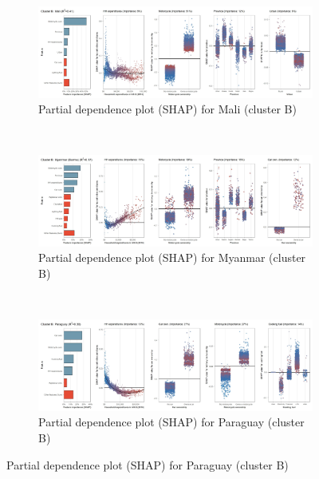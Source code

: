 \begin{figure}[ht!]\ContinuedFloat
    \centering
   \begin{subfigure}[b]{\textwidth}
         \centering
         \caption{Partial dependence plot (SHAP) for Mali (cluster B)}
         \label{fig:5b_MLI}
         \includegraphics[width=\textwidth]{Figure 5b/Figure_5b_MLI}         
     \end{subfigure}
    \\
    \vspace{0.5cm}
   \begin{subfigure}[b]{\textwidth}
         \centering
         \caption{Partial dependence plot (SHAP) for Myanmar (cluster B)}
         \label{fig:5b_MMR}
         \includegraphics[width=\textwidth]{Figure 5b/Figure_5b_MMR}         
     \end{subfigure}
    \\
    \vspace{0.5cm}
   \begin{subfigure}[b]{\textwidth}
         \centering
         \caption{Partial dependence plot (SHAP) for Paraguay (cluster B)}
         \label{fig:5b_PRY}
         \includegraphics[width=\textwidth]{Figure 5b/Figure_5b_PRY}

\end{subfigure}
\end{figure}
